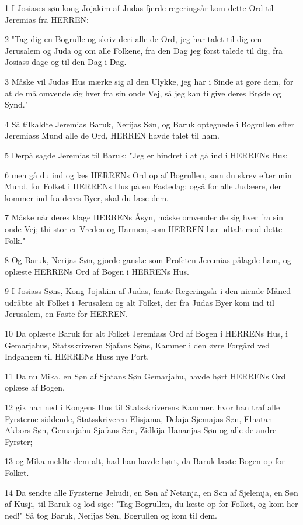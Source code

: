 \par 1 I Josiases søn kong Jojakim af Judas fjerde regeringsår kom dette Ord til Jeremias fra HERREN:
\par 2 "Tag dig en Bogrulle og skriv deri alle de Ord, jeg har talet til dig om Jerusalem og Juda og om alle Folkene, fra den Dag jeg først talede til dig, fra Josiass dage og til den Dag i Dag.
\par 3 Måske vil Judas Hus mærke sig al den Ulykke, jeg har i Sinde at gøre dem, for at de må omvende sig hver fra sin onde Vej, så jeg kan tilgive deres Brøde og Synd."
\par 4 Så tilkaldte Jeremias Baruk, Nerijas Søn, og Baruk optegnede i Bogrullen efter Jeremiass Mund alle de Ord, HERREN havde talet til ham.
\par 5 Derpå sagde Jeremias til Baruk: "Jeg er hindret i at gå ind i HERRENs Hus;
\par 6 men gå du ind og læs HERRENs Ord op af Bogrullen, som du skrev efter min Mund, for Folket i HERRENs Hus på en Fastedag; også for alle Judæere, der kommer ind fra deres Byer, skal du læse dem.
\par 7 Måske når deres klage HERRENs Åsyn, måske omvender de sig hver fra sin onde Vej; thi stor er Vreden og Harmen, som HERREN har udtalt mod dette Folk."
\par 8 Og Baruk, Nerijas Søn, gjorde ganske som Profeten Jeremias pålagde ham, og oplæste HERRENs Ord af Bogen i HERRENs Hus.
\par 9 I Josiass Søns, Kong Jojakim af Judas, femte Regeringsår i den niende Måned udråbte alt Folket i Jerusalem og alt Folket, der fra Judas Byer kom ind til Jerusalem, en Faste for HERREN.
\par 10 Da oplæste Baruk for alt Folket Jeremiass Ord af Bogen i HERRENs Hus, i Gemarjahus, Statsskriveren Sjafans Søns, Kammer i den øvre Forgård ved Indgangen til HERRENs Huss nye Port.
\par 11 Da nu Mika, en Søn af Sjatans Søn Gemarjahu, havde hørt HERRENs Ord oplæse af Bogen,
\par 12 gik han ned i Kongens Hus til Statsskriverens Kammer, hvor han traf alle Fyrsterne siddende, Statsskriveren Elisjama, Delaja Sjemajas Søn, Elnatan Akbors Søn, Gemarjahu Sjafans Søn, Zidkija Hananjas Søn og alle de andre Fyrster;
\par 13 og Mika meldte dem alt, had han havde hørt, da Baruk læste Bogen op for Folket.
\par 14 Da sendte alle Fyrsterne Jehudi, en Søn af Netanja, en Søn af Sjelemja, en Søn af Kusji, til Baruk og lod sige: "Tag Bogrullen, du læste op for Folket, og kom her ned!" Så tog Baruk, Nerijas Søn, Bogrullen og kom til dem.
